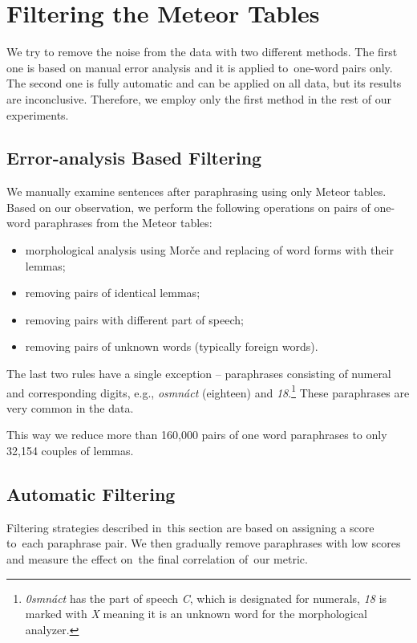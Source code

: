 \section{Filtering the Meteor Tables}
\label{filtering-section}

We try to remove the noise from the data with two different methods. The first
one is based on manual error analysis and it is applied to~one-word pairs only.
The second one is fully automatic and can be applied on all data, but its 
results are inconclusive. Therefore, we employ only the first method in the rest 
of our experiments.

\subsection{Error-analysis Based Filtering}
We manually examine sentences after paraphrasing using only Meteor tables. 
Based on our observation, we perform the following operations on pairs of 
one-word paraphrases from the Meteor tables:

\begin{itemize}
\item morphological analysis using Morče \citep{morce:2007} and replacing of 
word forms with their lemmas; 
\item removing pairs of identical lemmas;
\item removing pairs with different part of speech;
\item removing pairs of unknown words (typically foreign words).
\end{itemize}

The last two rules have a single exception -- paraphrases consisting of numeral 
and corresponding digits, e.g., \textit{osmnáct} (eighteen) and \textit{18}.\footnote{
\textit{0smnáct} has the part of speech \textit{C}, which is designated for numerals, 
\textit{18} is marked with \textit{X} meaning it is an unknown word for the 
morphological analyzer.} These paraphrases are very common in the data. 

This way we reduce more than 160,000 pairs of one word paraphrases to only 
32,154 couples of lemmas.

\subsection{Automatic Filtering}
Filtering strategies described in~this section are based on assigning a score 
to~each paraphrase pair. We then gradually remove paraphrases with low scores 
and measure the effect on~the final correlation of~our metric.

